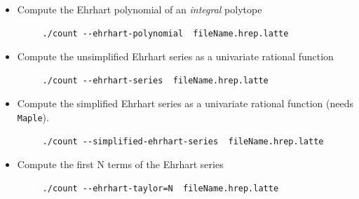 \documentclass{article}
\newcommand{\maple}{{\tt Maple}\xspace}
\begin{document}
\begin{itemize}
	
	
\item Compute the Ehrhart polynomial of an \emph{integral} polytope
	\begin{verbatim}
     ./count --ehrhart-polynomial  fileName.hrep.latte
	\end{verbatim} 
\item Compute the unsimplified Ehrhart series as a univariate rational function
	\begin{verbatim}
     ./count --ehrhart-series  fileName.hrep.latte
	\end{verbatim} 
\item Compute the simplified Ehrhart series as a univariate rational function (needs \maple).
	\begin{verbatim}
     ./count --simplified-ehrhart-series  fileName.hrep.latte
	\end{verbatim} 
\item Compute the first N terms of the Ehrhart series
	\begin{verbatim}
     ./count --ehrhart-taylor=N  fileName.hrep.latte
	\end{verbatim} 
\end{itemize}
\end{document}
